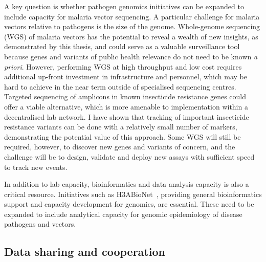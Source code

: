 \begin{refsection}
A key question is whether pathogen genomics initiatives can be expanded to include capacity for malaria vector sequencing.
%
A particular challenge for malaria vectors relative to pathogens is the size of the genome.
%
Whole-genome sequencing (WGS) of malaria vectors has the potential to reveal a wealth of new insights, as demonstrated by this thesis, and could serve as a valuable surveillance tool because genes and variants of public health relevance do not need to be known \textit{a priori}.
%
However, performing WGS at high throughput and low cost requires additional up-front investment in infrastructure and personnel, which may be hard to achieve in the near term outside of specialised sequencing centres.
%
Targeted sequencing of amplicons in known insecticide resistance genes could offer a viable alternative, which is more amenable to implementation within a decentralised lab network.
%
I have shown that tracking of important insecticide resistance variants can be done with a relatively small number of markers, demonstrating the potential value of this approach.
%
Some WGS will still be required, however, to discover new genes and variants of concern, and the challenge will be to design, validate and deploy new assays with sufficient speed to track new events.


In addition to lab capacity, bioinformatics and data analysis capacity is also a critical resource.
%
Initiatives such as H3ABioNet~\parencite{Kumuthini2019}, providing general bioinformatics support and capacity development for genomics, are essential.
%
These need to be expanded to include analytical capacity for genomic epidemiology of disease pathogens and vectors.


\subsection{Data sharing and cooperation}



\end{refsection}

